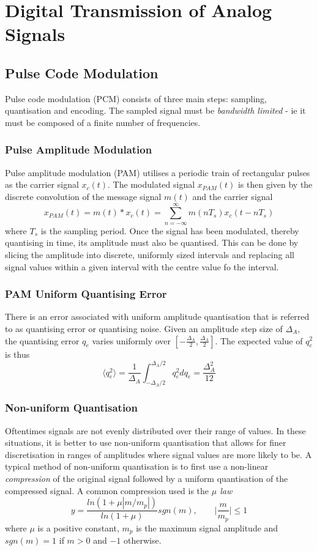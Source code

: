 \documentclass[]{article}
\begin{document}
\newpage
\section{Digital Transmission of Analog Signals}
\subsection{Pulse Code Modulation}
Pulse code modulation (PCM) consists of three main steps: sampling, quantisation and encoding. The sampled signal must be \textit{bandwidth limited} - ie it must be composed of a finite number of frequencies.
\subsubsection{Pulse Amplitude Modulation}
Pulse amplitude modulation (PAM) utilises a periodic train of rectangular pulses as the carrier signal $x_{c}(t)$. The modulated signal $x_{PAM}(t)$ is then given by the discrete convolution of the message signal $m(t)$ and the carrier signal
\begin{equation} x_{PAM}(t) = m(t)*x_{c}(t) = \sum_{n=-\infty}^{\infty} m(nT_{s})x_{c}(t-nT_{s}) \end{equation}
where $T_{s}$ is the sampling period.
Once the signal has been modulated, thereby quantising in time, its amplitude must also be quantised. This can be done by slicing the amplitude into discrete, uniformly sized intervals and replacing all signal values within a given interval with the centre value fo the interval.
\subsubsection{PAM Uniform Quantising Error}
There is an error associated with uniform amplitude quantisation that is referred to as quantising error or quantising noise. Given an amplitude step size of $\Delta_{A}$, the quantising error $q_{e}$ varies uniformly over $[-\frac{\Delta_{A}}{2}, \frac{\Delta_{A}}{2}]$. The expected value of $q_{e}^{2}$ is thus
\begin{equation} \langle q_{e}^{2} \rangle = \frac{1}{\Delta_{A}} \int_{-\Delta_{A}/2}^{\Delta_{A}/2} q_{e}^{2}dq_{e} = \frac{\Delta_{A}^{2}}{12} \end{equation}
\subsubsection{Non-uniform Quantisation}
Oftentimes signals are not evenly distributed over their range of values. In these situations, it is better to use non-uniform quantisation that allows for finer discretisation in ranges of amplitudes where signal values are more likely to be. A typical method of non-uniform quantisation is to first use a non-linear \textit{compression} of the original signal followed by a uniform quantisation of the compressed signal. A common compression used is the \textit{$\mu$ law}
\begin{equation} y = \frac{ln(1+\mu|m/m_{p}|)}{ln(1+\mu)}sgn(m), \qquad \bigg|\frac{m}{m_{p}}\bigg| \leq 1 \end{equation}
where $\mu$ is a positive constant, $m_{p}$ is the maximum signal amplitude and $sgn(m) = 1$ if $m>0$ and $-1$ otherwise.
\end{document}
